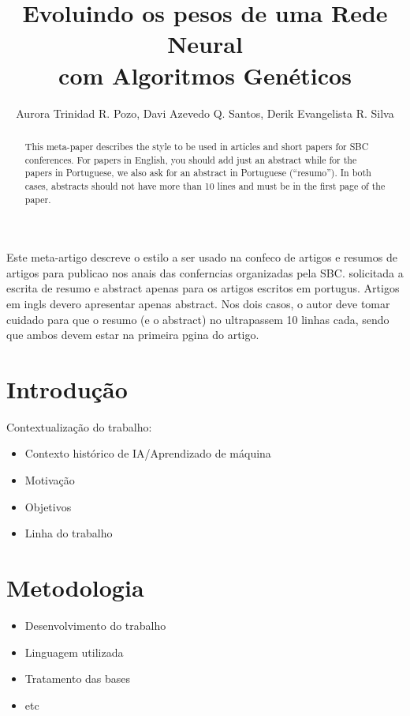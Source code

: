 \documentclass[12pt]{article}
\title{Evoluindo os pesos de uma Rede Neural \\com Algoritmos Genéticos}
\author{Aurora Trinidad R. Pozo\inst{1}, Davi Azevedo Q. Santos\inst{1}, Derik Evangelista R. Silva\inst{1}}
\begin{document}
 

\maketitle

\begin{abstract}
  This meta-paper describes the style to be used in articles and short papers
  for SBC conferences. For papers in English, you should add just an abstract
  while for the papers in Portuguese, we also ask for an abstract in
  Portuguese (``resumo''). In both cases, abstracts should not have more than
  10 lines and must be in the first page of the paper.
\end{abstract}
     
\begin{resumo} 
  Este meta-artigo descreve o estilo a ser usado na confeco de artigos e
  resumos de artigos para publicao nos anais das conferncias organizadas
  pela SBC.  solicitada a escrita de resumo e abstract apenas para os artigos
  escritos em portugus. Artigos em ingls devero apresentar apenas abstract.
  Nos dois casos, o autor deve tomar cuidado para que o resumo (e o abstract)
  no ultrapassem 10 linhas cada, sendo que ambos devem estar na primeira
  pgina do artigo.
\end{resumo}


\section{Introdução}

Contextualização do trabalho: 
\begin{itemize}
\item Contexto histórico de IA/Aprendizado de máquina
\item Motivação
\item Objetivos
\item Linha do trabalho
\end{itemize}

\section{Metodologia} \label{sec:metodologia}

\begin{itemize}
\item Desenvolvimento do trabalho
\item Linguagem utilizada
\item Tratamento das bases
\item etc
\end{itemize}
\end{document}
